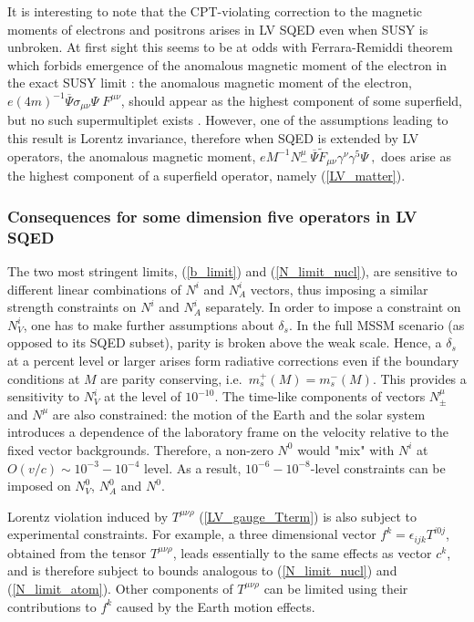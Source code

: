\documentclass[12pt]{revtex4}
\begin{document}
It is interesting to note that the CPT-violating correction to
the magnetic moments of electrons and positrons arises in LV SQED 
even when SUSY is unbroken. At first sight this seems to 
be at odds with Ferrara-Remiddi theorem which
forbids emergence of the anomalous magnetic moment of the
electron in the exact SUSY limit \cite{Ferrara:1974wb}: 
the anomalous magnetic moment of the electron, 
$e(4m)^{-1} \overline{\Psi} \sigma_{\mu\nu} \Psi \; F^{\mu\nu}$,
should appear as the highest component of some superfield, but
no such supermultiplet exists \cite{Ferrara:1974wb}. However, one of
the assumptions leading to this result is Lorentz invariance, therefore 
when SQED is extended by LV operators, the anomalous magnetic 
moment, 
\( 
eM^{-1}N_-^\mu \, \overline{\Psi} \widetilde{F}_{\mu\nu}
\gamma^\nu \gamma^5 \Psi~, 
\) 
does arise as the highest component of a superfield  operator, namely 
(\ref{LV_matter}). 


\subsubsection*{Consequences for some dimension five operators in LV
SQED} 


The two most stringent limits, (\ref{b_limit}) and (\ref{N_limit_nucl}),
are sensitive to different linear combinations of $N^i$ and $N_A^i$ vectors,
thus imposing a similar strength constraints on $N^i$ and $N_A^i$
separately. In order to impose a constraint on $N_V^i$, one has to  
make further assumptions about $\delta_s$. In the full MSSM scenario
(as opposed to its SQED subset), parity is broken above the weak
scale. 
Hence,  a $\delta_s $ at a percent level or larger
arises form radiative corrections even if the boundary conditions at
$M$ are parity conserving, i.e.\ $m_s^+(M) = m_s^-(M)$. 
This provides a sensitivity to $N_V^i$ at the level of $10^{-10}$. 
The time-like components of vectors $N_\pm^\mu$ and $N^\mu $ are 
also constrained:  
the motion of the Earth and the solar system introduces a dependence
of the laboratory frame  on the velocity relative to the fixed vector
backgrounds. Therefore, a non-zero $N^0$ would "mix" with 
$N^i$ at $O(v/c) \sim 10^{-3}-10^{-4}$ level. As a result, 
$10^{-6}-10^{-8}$-level constraints can be 
imposed on $N_V^0$, $N_A^0$ and $N^0$. 


Lorentz violation induced by $ T^{\mu\nu\rho} $ (\ref{LV_gauge_Tterm})
is also subject to experimental constraints. For example, 
a three dimensional vector $ f^k=\epsilon_{ijk} T^{i0j}$, 
obtained from the tensor $T^{\mu\nu\rho} $, leads essentially to the
same effects as  vector $c^k$, and is therefore subject to bounds
analogous to (\ref{N_limit_nucl}) and (\ref{N_limit_atom}). Other
components of $ T^{\mu\nu\rho} $ can be limited using   
their contributions to $f^k$ caused by the Earth motion effects. 
\end{document}
